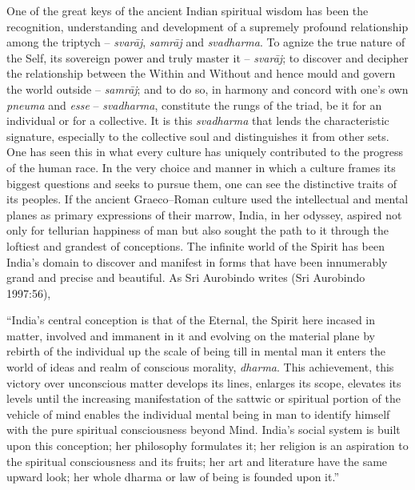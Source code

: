 One of the great keys of the ancient Indian spiritual wisdom has been the recognition, understanding and development of a supremely profound relationship among the triptych – \textit{svarāj}, \textit{samrāj} and \textit{svadharma}. To agnize the true nature of the Self, its sovereign power and truly master it – \textit{svarāj}; to discover and decipher the relationship between the Within and Without and hence mould and govern the world outside – \textit{samrāj}; and to do so, in harmony and concord with one’s own \textit{pneuma} and \textit{esse} – \textit{svadharma}, constitute the rungs of the triad, be it for an individual or for a collective. It is this \textit{svadharma} that lends the characteristic signature, especially to the collective soul and distinguishes it from other sets. One has seen this in what every culture has uniquely contributed to the progress of the human race. In the very choice and manner in which a culture frames its biggest questions and seeks to pursue them, one can see the distinctive traits of its peoples. If the ancient Graeco–Roman culture used the intellectual and mental planes as primary expressions of their marrow, India, in her odyssey, aspired not only for tellurian happiness of man but also sought the path to it through the loftiest and grandest of conceptions. The infinite world of the Spirit has been India’s domain to discover and manifest in forms that have been innumerably grand and precise and beautiful. As Sri Aurobindo writes (Sri Aurobindo 1997:56),

\begin{myquote}
“India’s central conception is that of the Eternal, the Spirit here incased in matter, involved and immanent in it and evolving on the material plane by rebirth of the individual up the scale of being till in mental man it enters the world of ideas and realm of conscious morality, \textit{dharma}. This achievement, this victory over unconscious matter develops its lines, enlarges its scope, elevates its levels until the increasing manifestation of the sattwic or spiritual portion of the vehicle of mind enables the individual mental being in man to identify himself with the pure spiritual consciousness beyond Mind. India’s social system is built upon this conception; her philosophy formulates it; her religion is an aspiration to the spiritual consciousness and its fruits; her art and literature have the same upward look; her whole dharma or law of being is founded upon it.”
\end{myquote}

